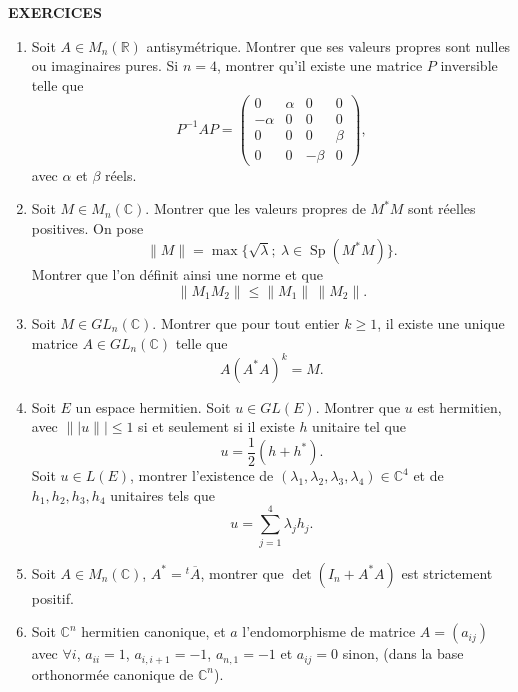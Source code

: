 
\clearpage
\begin{center}
{\Large\sffamily\bfseries\color{BellaLavenderDeep} EXERCICES}
\end{center}
\vspace{0.8em}

\begin{enumerate}[label=\arabic*.,leftmargin=2.2em,itemsep=1.1em]

\item Soit $A\in M_n(\mathbb R)$ antisymétrique. Montrer que ses valeurs propres sont nulles ou imaginaires pures. Si $n=4$, montrer qu'il existe une matrice $P$ inversible telle que
\[
P^{-1}AP=
\begin{pmatrix}
0&\alpha&0&0\\
-\alpha&0&0&0\\
0&0&0&\beta\\
0&0&-\beta&0
\end{pmatrix},
\]
avec $\alpha$ et $\beta$ réels.

\item Soit $M\in M_n(\mathbb C)$. Montrer que les valeurs propres de $M^*M$ sont réelles positives. On pose
\[
\|M\|=\max\{\sqrt\lambda;\ \lambda\in\operatorname{Sp}(M^*M)\}.
\]
Montrer que l'on définit ainsi une norme et que
\[
\|M_1M_2\|\le \|M_1\|\,\|M_2\|.
\]

\item Soit $M\in GL_n(\mathbb C)$. Montrer que pour tout entier $k\ge1$, il existe une unique matrice $A\in GL_n(\mathbb C)$ telle que
\[
A(A^*A)^k=M.
\]

\item Soit $E$ un espace hermitien. Soit $u\in GL(E)$. Montrer que $u$ est hermitien, avec $\|\!|u\|\!|\le1$ si et seulement si il existe $h$ unitaire tel que
\[
u=\frac12(h+h^*).
\]
Soit $u\in L(E)$, montrer l'existence de $(\lambda_1,\lambda_2,\lambda_3,\lambda_4)\in\mathbb C^4$ et de $h_1,h_2,h_3,h_4$ unitaires tels que
\[
u=\sum_{j=1}^4\lambda_jh_j.
\]

\item Soit $A\in M_n(\mathbb C)$, $A^*={}^t\!\overline A$, montrer que $\det(I_n+A^*A)$ est strictement positif.

\item Soit $\mathbb C^n$ hermitien canonique, et $a$ l'endomorphisme de matrice $A=(a_{ij})$ avec $\forall i$, $a_{ii}=1$, $a_{i,i+1}=-1$, $a_{n,1}=-1$ et $a_{ij}=0$ sinon, (dans la base orthonormée canonique de $\mathbb C^n$).


\end{enumerate}
